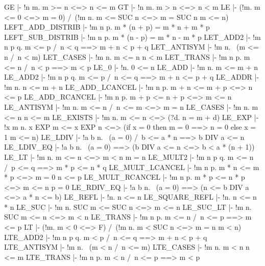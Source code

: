\THEOREM GE
  |- !n m. m >= n <=> n <= m
\ENDTHEOREM
\THEOREM GT
  |- !n m. m > n <=> n < m
\ENDTHEOREM
\THEOREM LE
  |- (!m. m <= 0 <=> m = 0) /\ (!m n. m <= SUC n <=> m = SUC n \/ m <= n)
\ENDTHEOREM
\THEOREM LEFT\_ADD\_DISTRIB
  |- !m n p. m * (n + p) = m * n + m * p
\ENDTHEOREM
\THEOREM LEFT\_SUB\_DISTRIB
  |- !m n p. m * (n - p) = m * n - m * p
\ENDTHEOREM
\THEOREM LET\_ADD2
  |- !m n p q. m <= p /\ n < q ==> m + n < p + q
\ENDTHEOREM
\THEOREM LET\_ANTISYM
  |- !m n. ~(m <= n /\ n < m)
\ENDTHEOREM
\THEOREM LET\_CASES
  |- !m n. m <= n \/ n < m
\ENDTHEOREM
\THEOREM LET\_TRANS
  |- !m n p. m <= n /\ n < p ==> m < p
\ENDTHEOREM
\THEOREM LE\_0
  |- !n. 0 <= n
\ENDTHEOREM
\THEOREM LE\_ADD
  |- !m n. m <= m + n
\ENDTHEOREM
\THEOREM LE\_ADD2
  |- !m n p q. m <= p /\ n <= q ==> m + n <= p + q
\ENDTHEOREM
\THEOREM LE\_ADDR
  |- !m n. n <= m + n
\ENDTHEOREM
\THEOREM LE\_ADD\_LCANCEL
  |- !m n p. m + n <= m + p <=> n <= p
\ENDTHEOREM
\THEOREM LE\_ADD\_RCANCEL
  |- !m n p. m + p <= n + p <=> m <= n
\ENDTHEOREM
\THEOREM LE\_ANTISYM
  |- !m n. m <= n /\ n <= m <=> m = n
\ENDTHEOREM
\THEOREM LE\_CASES
  |- !m n. m <= n \/ n <= m
\ENDTHEOREM
\THEOREM LE\_EXISTS
  |- !m n. m <= n <=> (?d. n = m + d)
\ENDTHEOREM
\THEOREM LE\_EXP
  |- !x m n.
         x EXP m <= x EXP n <=>
         (if x = 0 then m = 0 ==> n = 0 else x = 1 \/ m <= n)
\ENDTHEOREM
\THEOREM LE\_LDIV
  |- !a b n. ~(a = 0) /\ b <= a * n ==> b DIV a <= n
\ENDTHEOREM
\THEOREM LE\_LDIV\_EQ
  |- !a b n. ~(a = 0) ==> (b DIV a <= n <=> b < a * (n + 1))
\ENDTHEOREM
\THEOREM LE\_LT
  |- !m n. m <= n <=> m < n \/ m = n
\ENDTHEOREM
\THEOREM LE\_MULT2
  |- !m n p q. m <= n /\ p <= q ==> m * p <= n * q
\ENDTHEOREM
\THEOREM LE\_MULT\_LCANCEL
  |- !m n p. m * n <= m * p <=> m = 0 \/ n <= p
\ENDTHEOREM
\THEOREM LE\_MULT\_RCANCEL
  |- !m n p. m * p <= n * p <=> m <= n \/ p = 0
\ENDTHEOREM
\THEOREM LE\_RDIV\_EQ
  |- !a b n. ~(a = 0) ==> (n <= b DIV a <=> a * n <= b)
\ENDTHEOREM
\THEOREM LE\_REFL
  |- !n. n <= n
\ENDTHEOREM
\THEOREM LE\_SQUARE\_REFL
  |- !n. n <= n * n
\ENDTHEOREM
\THEOREM LE\_SUC
  |- !m n. SUC m <= SUC n <=> m <= n
\ENDTHEOREM
\THEOREM LE\_SUC\_LT
  |- !m n. SUC m <= n <=> m < n
\ENDTHEOREM
\THEOREM LE\_TRANS
  |- !m n p. m <= n /\ n <= p ==> m <= p
\ENDTHEOREM
\THEOREM LT
  |- (!m. m < 0 <=> F) /\ (!m n. m < SUC n <=> m = n \/ m < n)
\ENDTHEOREM
\THEOREM LTE\_ADD2
  |- !m n p q. m < p /\ n <= q ==> m + n < p + q
\ENDTHEOREM
\THEOREM LTE\_ANTISYM
  |- !m n. ~(m < n /\ n <= m)
\ENDTHEOREM
\THEOREM LTE\_CASES
  |- !m n. m < n \/ n <= m
\ENDTHEOREM
\THEOREM LTE\_TRANS
  |- !m n p. m < n /\ n <= p ==> m < p

